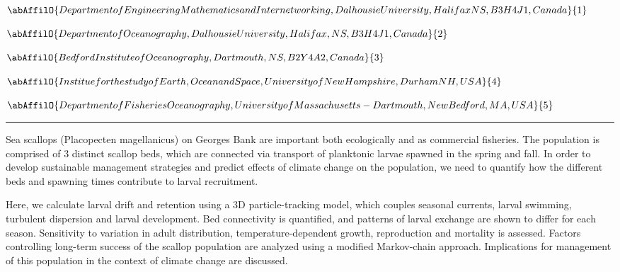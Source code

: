 \begin{center}
   \vspace{2 mm} \begin{center}
    \vspace{2 mm}\begin{center}
  
  $\abAffilO{Department of Engineering Mathematics and Internetworking, Dalhousie University, Halifax NS, B3H 4J1, Canada}{1}$

  
  $\abAffilO{Department of Oceanography, Dalhousie University, Halifax, NS, B3H 4J1, Canada}{2}$

  
  $\abAffilO{Bedford Institute of Oceanography, Dartmouth, NS, B2Y 4A2, Canada}{3}$

  
  $\abAffilO{Institue for the study of Earth, Ocean and Space, University of New Hampshire, Durham NH, USA}{4}$

  
  $\abAffilO{Department of Fisheries Oceanography, University of Massachusetts-Dartmouth, New Bedford, MA, USA}{5}$

  \end{center}
  \vspace{2 mm}
  \end{center}\end{center}
  \begin{center}\rule{0.70\linewidth}{0.5 pt}\end{center}

\noindent Sea scallops (Placopecten magellanicus) on Georges Bank are important both ecologically and as commercial fisheries. The population is comprised of 3 distinct scallop beds, which are connected via transport of planktonic larvae spawned in the spring and fall. In order to develop sustainable management strategies and predict effects of climate change on the population, we need to quantify how the different beds and spawning times contribute to larval recruitment. 

Here, we calculate larval drift and retention using a 3D particle-tracking model, which couples seasonal currents, larval swimming, turbulent dispersion and larval development. Bed connectivity is quantified, and patterns of larval exchange are shown to differ for each season. Sensitivity to variation in adult distribution, temperature-dependent growth, reproduction and mortality is assessed. Factors controlling long-term success of the scallop population are analyzed using a modified Markov-chain approach. Implications for management of this population in the context of climate change are discussed.

